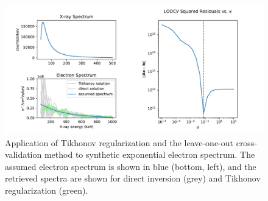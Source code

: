 \begin{figure}[h]
    \centering
    \includegraphics[width=1.1\textwidth]{figures/figure_11.pdf}
    \caption{Application of Tikhonov regularization and the leave-one-out cross-validation method to synthetic exponential electron spectrum. The assumed electron spectrum is shown in blue (bottom, left), and the retrieved spectra are shown for direct inversion (grey) and Tikhonov regularization (green).}
    \label{cross-validation-example}
\end{figure}

